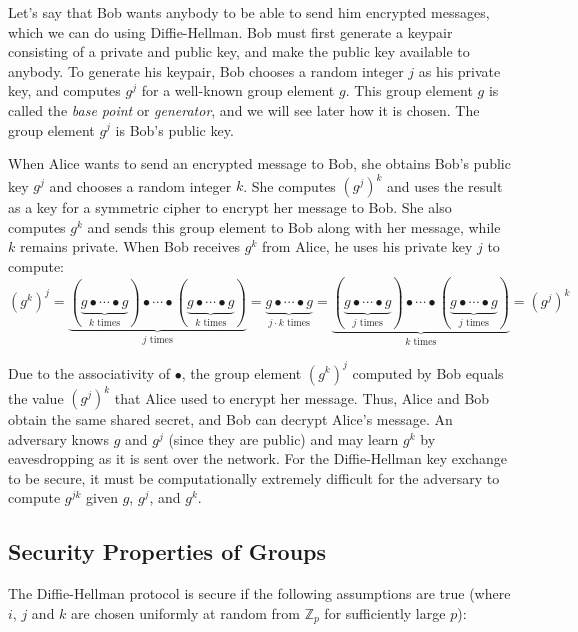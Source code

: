 \documentclass{article}
\begin{document}
Let's say that Bob wants anybody to be able to send him encrypted messages, which we can do using Diffie-Hellman.
Bob must first generate a keypair consisting of a private and public key, and make the public key available to anybody.
To generate his keypair, Bob chooses a random integer $j$ as his private key, and computes $g^j$ for a well-known group element $g$.
This group element $g$ is called the \emph{base point} or \emph{generator}, and we will see later how it is chosen.
The group element $g^j$ is Bob's public key.

When Alice wants to send an encrypted message to Bob, she obtains Bob's public key $g^j$ and chooses a random integer $k$.
She computes $(g^j)^k$ and uses the result as a key for a symmetric cipher to encrypt her message to Bob.
She also computes $g^k$ and sends this group element to Bob along with her message, while $k$ remains private.
When Bob receives $g^k$ from Alice, he uses his private key $j$ to compute:
\begin{equation*}
(g^k)^j =
\underbrace{(\underbrace{g \bullet\cdots\bullet g}_\text{$k$ times}) \bullet\cdots\bullet (\underbrace{g \bullet\cdots\bullet g}_\text{$k$ times})}_\text{$j$ times} =
\underbrace{g \bullet\cdots\bullet g}_\text{$j \cdot k$ times} =
\underbrace{(\underbrace{g \bullet\cdots\bullet g}_\text{$j$ times}) \bullet\cdots\bullet (\underbrace{g \bullet\cdots\bullet g}_\text{$j$ times})}_\text{$k$ times} =
(g^j)^k
\end{equation*}

Due to the associativity of $\bullet$, the group element $(g^k)^j$ computed by Bob equals the value $(g^j)^k$ that Alice used to encrypt her message.
Thus, Alice and Bob obtain the same shared secret, and Bob can decrypt Alice's message.
An adversary knows $g$ and $g^j$ (since they are public) and may learn $g^k$ by eavesdropping as it is sent over the network.
For the Diffie-Hellman key exchange to be secure, it must be computationally extremely difficult for the adversary to compute $g^{jk}$ given $g$, $g^j$, and $g^k$.

\subsection{Security Properties of Groups}\label{sec:cdh-ddh}

The Diffie-Hellman protocol is secure if the following assumptions are true (where $i$, $j$ and $k$ are chosen uniformly at random from $\mathbb{Z}_p$ for sufficiently large $p$):
\end{document}
